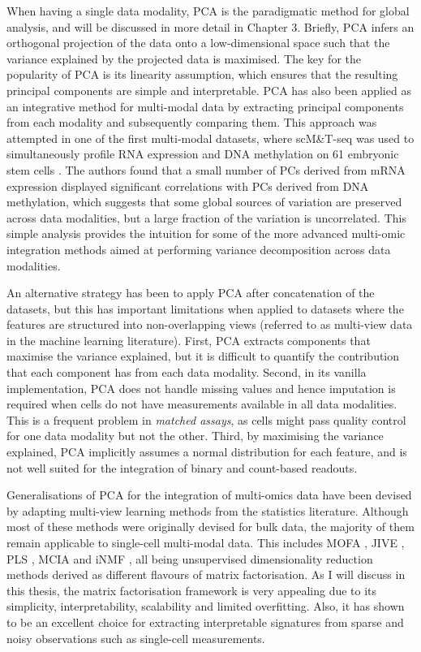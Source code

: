 When having a single data modality, PCA is the paradigmatic method for global analysis, and will be discussed in more detail in Chapter 3. Briefly, PCA infers an orthogonal projection of the data onto a low-dimensional space such that the variance explained by the projected data is maximised. The key for the popularity of PCA is its linearity assumption, which ensures that the resulting principal components are simple and interpretable. PCA has also been applied as an integrative method for multi-modal data by extracting principal components from each modality and subsequently comparing them. This approach was attempted in one of the first multi-modal datasets, where scM\&T-seq was used to simultaneously profile RNA expression and DNA methylation on 61 embryonic stem cells \cite{Angermueller2016}. The authors found that a small number of PCs derived from mRNA expression displayed significant correlations with PCs derived from DNA methylation, which suggests that some global sources of variation are preserved across data modalities, but a large fraction of the variation is uncorrelated. This simple analysis provides the intuition for some of the more advanced multi-omic integration methods aimed at performing variance decomposition across data modalities.

An alternative strategy has been to apply PCA after concatenation of the datasets, but this has important limitations when applied to datasets where the features are structured into non-overlapping views (referred to as multi-view data in the machine learning literature). First, PCA extracts components that maximise the variance explained, but it is difficult to quantify the contribution that each component has from each data modality. Second, in its vanilla implementation, PCA does not handle missing values and hence imputation is required when cells do not have measurements available in all data modalities. This is a frequent problem in \textit{matched assays}, as cells might pass quality control for one data modality but not the other. Third, by maximising the variance explained, PCA implicitly assumes a normal distribution for each feature, and is not well suited for the integration of binary and count-based readouts. 

Generalisations of PCA for the integration of multi-omics data have been devised by adapting multi-view learning methods from the statistics literature. Although most of these methods were originally devised for bulk data, the majority of them remain applicable to single-cell multi-modal data. This includes MOFA \cite{Argelaguet2018}, JIVE \cite{Lock2013}, PLS \cite{Singh2018}, MCIA \cite{Meng2014} and iNMF \cite{Welch2019}, all being unsupervised dimensionality reduction methods derived as different flavours of matrix factorisation. As I will discuss in this thesis, the matrix factorisation framework is very appealing due to its simplicity, interpretability, scalability and limited overfitting. Also, it has shown to be an excellent choice for extracting interpretable signatures from sparse and noisy observations such as single-cell measurements.


